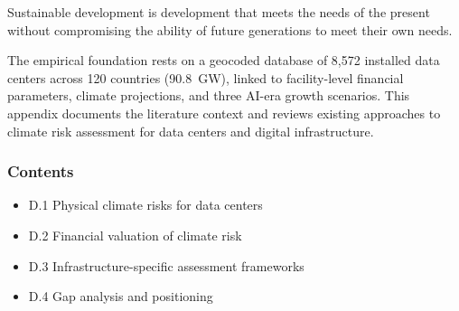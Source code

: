\vspace{4mm}

\begin{pullquote}
Sustainable development is development that meets the needs of the present without compromising the ability of future generations to meet their own needs.
\end{pullquote}

\vspace{4mm}

\begin{twocolbody}
\noindent The empirical foundation rests on a geocoded database of 8,572 installed data centers across 120 countries (90.8~GW), linked to facility-level financial parameters, climate projections, and three AI-era growth scenarios. This appendix documents the literature context and reviews existing approaches to climate risk assessment for data centers and digital infrastructure.

\subsubsection*{Contents}
\begin{itemize}[leftmargin=10pt, itemsep=2pt]
  \item D.1 Physical climate risks for data centers
  \item D.2 Financial valuation of climate risk
  \item D.3 Infrastructure-specific assessment frameworks
  \item D.4 Gap analysis and positioning
\end{itemize}
\end{twocolbody}

\clearpage
